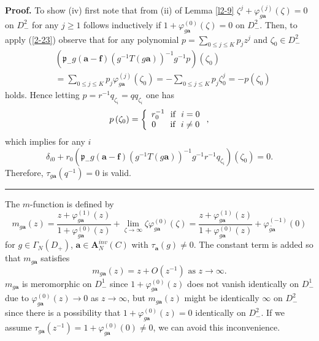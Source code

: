 \documentclass[a4paper]{article}%
\newenvironment{proof}[1][Proof]{\noindent\textbf{#1.} }{\ \rule{0.5em}{0.5em}}
\begin{document}
\begin{proof}
To show (iv) first note that from (ii) of Lemma \ref{l2-9} $\zeta^{j}%
+\varphi_{g\boldsymbol{a}}^{\left(  j\right)  }\left(  \zeta\right)  =0$ on
$D_{-}^{2}$ for any $j\geq1$ follows inductively if $1+\varphi
_{g\boldsymbol{a}}^{\left(  0\right)  }\left(  \zeta\right)  =0$ on $D_{-}%
^{2}$. Then, to apply (\ref{2-23}) observe that for any polynomial
$p=\sum_{0\leq j\leq K}p_{j}z^{j}$ and $\zeta_{0}\in D_{-}^{2}$
\begin{align*}
&  \left(  \mathfrak{p}_{-}g\left(  \boldsymbol{a}-\boldsymbol{f}\right)
\left(  g^{-1}T\left(  g\boldsymbol{a}\right)  \right)  ^{-1}g^{-1}p\right)
\left(  \zeta_{0}\right) \\
&  =\sum_{0\leq j\leq K}p_{j}\varphi_{g\boldsymbol{a}}^{\left(  j\right)
}\left(  \zeta_{0}\right)  =-\sum_{0\leq j\leq K}p_{j}\zeta_{0}^{j}=-p\left(
\zeta_{0}\right)
\end{align*}
holds. Hence letting $p=r^{-1}q_{\zeta_{i}}=qq_{\zeta_{i}}$ one has%
\[
p\left(  \zeta_{0}\right)  =\left\{
\begin{array}
[c]{c}%
r_{0}^{-1}\text{ \ if \ }i=0\\
0\text{ \ \ \ \ if \ }i\neq0
\end{array}
\right.  \text{,}%
\]
which implies for any $i$%
\[
\delta_{i0}+r_{0}\left(  \mathfrak{p}_{-}g\left(  \boldsymbol{a}%
-\boldsymbol{f}\right)  \left(  g^{-1}T\left(  g\boldsymbol{a}\right)
\right)  ^{-1}g^{-1}r^{-1}q_{\zeta_{i}}\right)  \left(  \zeta_{0}\right)
=0\text{.}%
\]
Therefore, $\tau_{g\boldsymbol{a}}\left(  q^{-1}\right)  =0$ is valid.\bigskip
\end{proof}

The $m$-function is defined by%
\[
m_{g\boldsymbol{a}}\left(  z\right)  =\dfrac{z+\varphi_{g\boldsymbol{a}%
}^{\left(  1\right)  }\left(  z\right)  }{1+\varphi_{g\boldsymbol{a}}^{\left(
0\right)  }\left(  z\right)  }+\lim_{\zeta\rightarrow\infty}\zeta
\varphi_{g\boldsymbol{a}}^{\left(  0\right)  }\left(  \zeta\right)
=\dfrac{z+\varphi_{g\boldsymbol{a}}^{\left(  1\right)  }\left(  z\right)
}{1+\varphi_{g\boldsymbol{a}}^{\left(  0\right)  }\left(  z\right)  }%
+\varphi_{\widetilde{g\boldsymbol{a}}}^{\left(  -1\right)  }\left(  0\right)
\]
for $g\in\Gamma_{N}\left(  D_{+}\right)  $, $\boldsymbol{a}\in\boldsymbol{A}%
_{N}^{inv}\left(  C\right)  $ with $\tau_{\boldsymbol{a}}\left(  g\right)
\neq0$. The constant term is added so that $m_{g\boldsymbol{a}}$ satisfies%
\[
m_{g\boldsymbol{a}}\left(  z\right)  =z+O\left(  z^{-1}\right)  \text{ \ as
\ }z\rightarrow\infty\text{.}%
\]
$m_{g\boldsymbol{a}}$ is meromorphic on $D_{-}^{1}$ since $1+\varphi
_{g\boldsymbol{a}}^{\left(  0\right)  }\left(  z\right)  $ does not vanish
identically on $D_{-}^{1}$ due to $\varphi_{g\boldsymbol{a}}^{\left(
0\right)  }\left(  z\right)  \rightarrow0$ as $z\rightarrow\infty$, but
$m_{g\boldsymbol{a}}\left(  z\right)  $ might be identically $\infty$ on
$D_{-}^{2}$ since there is a possibility that $1+\varphi_{g\boldsymbol{a}%
}^{\left(  0\right)  }\left(  z\right)  =0$ identically on $D_{-}^{2}$. If we
assume $\tau_{g\boldsymbol{a}}\left(  z^{-1}\right)  =1+\varphi
_{g\boldsymbol{a}}^{\left(  0\right)  }\left(  0\right)  \neq0$, we can avoid
this inconvenience.
\end{document}
